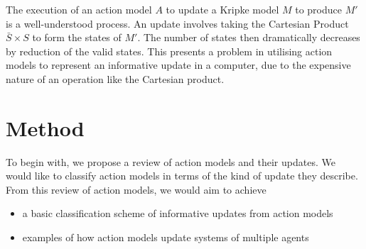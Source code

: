 \documentclass[12pt, a4paper]{article}
\begin{document}
The execution of an action model $A$ to update a Kripke model $M$ to produce $M'$ is a well-understood process.
An update involves taking the Cartesian Product $\bar{S} \times S$ to form the states of $M'$.
The number of states then dramatically decreases by reduction of the valid states.
This presents a problem in utilising action models to represent an informative update in a computer, due to the expensive nature of an operation like the Cartesian product.
%
 
\section*{Method}

To begin with, we propose a review of action models and their updates.
We would like to classify action models in terms of the kind of update they describe.
From this review of action models, we would aim to achieve
\begin{itemize}
	\item a basic classification scheme of informative updates from action models
	\item examples of how action models update systems of multiple agents
\end{itemize}
\end{document}
